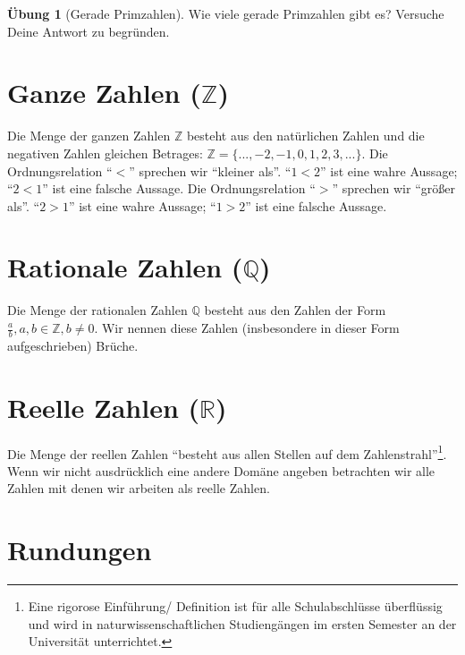 \documentclass[a4paper]{book}%
\theoremstyle{definition}
\newtheorem{uebung}{Übung}
\begin{document}
\begin{uebung}[Gerade Primzahlen]
    Wie viele gerade Primzahlen gibt es? Versuche Deine Antwort zu begründen.
\end{uebung}


\section{Ganze Zahlen ($\mathbb{Z}$)}

Die Menge der ganzen Zahlen $\mathbb{Z}$ besteht aus den natürlichen Zahlen und die negativen Zahlen gleichen Betrages: $\mathbb{Z}=\{..., -2, -1, 0, 1, 2, 3, ...\}$. Die Ordnungsrelation \enquote{$<$}\index{$<$} sprechen wir \enquote{kleiner als}. \enquote{$1<2$} ist eine wahre Aussage; \enquote{$2<1$} ist eine falsche Aussage. Die Ordnungsrelation \enquote{$>$}\index{$>$} sprechen wir \enquote{größer als}. \enquote{$2>1$} ist eine wahre Aussage; \enquote{$1>2$} ist eine falsche Aussage.


\section{Rationale Zahlen ($\mathbb{Q}$)}

Die Menge der rationalen Zahlen $\mathbb{Q}$ besteht aus den Zahlen der Form $\frac{a}{b}, a, b \in \mathbb{Z}, b \neq 0$. Wir nennen diese Zahlen (insbesondere in dieser Form aufgeschrieben) Brüche.


\section{Reelle Zahlen ($\mathbb{R}$)}

Die Menge der reellen Zahlen  \enquote{besteht aus allen Stellen auf dem Zahlenstrahl}\footnote{Eine rigorose Einführung/ Definition ist für alle Schulabschlüsse überflüssig und wird in naturwissenschaftlichen Studiengängen im ersten Semester an der Universität unterrichtet.}. Wenn wir nicht ausdrücklich eine andere Domäne angeben betrachten wir alle Zahlen mit denen wir arbeiten als reelle Zahlen.


\section{Rundungen}
\end{document}
